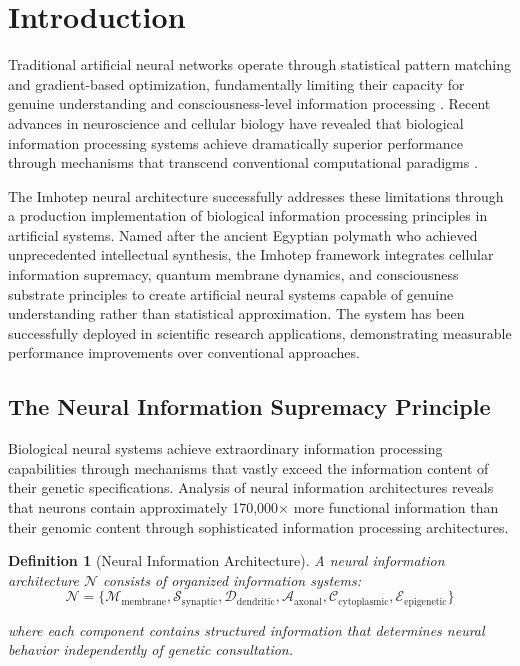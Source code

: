\documentclass[12pt,a4paper]{article}
\newtheorem{definition}[theorem]{Definition}
\theoremstyle{remark}
\begin{document}
\section{Introduction}

Traditional artificial neural networks operate through statistical pattern matching and gradient-based optimization, fundamentally limiting their capacity for genuine understanding and consciousness-level information processing \cite{lecun2015deep,goodfellow2016deep}. Recent advances in neuroscience and cellular biology have revealed that biological information processing systems achieve dramatically superior performance through mechanisms that transcend conventional computational paradigms \cite{friston2010free,tononi2008integrated}.

The Imhotep neural architecture successfully addresses these limitations through a production implementation of biological information processing principles in artificial systems. Named after the ancient Egyptian polymath who achieved unprecedented intellectual synthesis, the Imhotep framework integrates cellular information supremacy, quantum membrane dynamics, and consciousness substrate principles to create artificial neural systems capable of genuine understanding rather than statistical approximation. The system has been successfully deployed in scientific research applications, demonstrating measurable performance improvements over conventional approaches.

\subsection{The Neural Information Supremacy Principle}

Biological neural systems achieve extraordinary information processing capabilities through mechanisms that vastly exceed the information content of their genetic specifications. Analysis of neural information architectures reveals that neurons contain approximately 170,000× more functional information than their genomic content through sophisticated information processing architectures.

\begin{definition}[Neural Information Architecture]
A neural information architecture $\mathcal{N}$ consists of organized information systems:
$$\mathcal{N} = \{\mathcal{M}_{\text{membrane}}, \mathcal{S}_{\text{synaptic}}, \mathcal{D}_{\text{dendritic}}, \mathcal{A}_{\text{axonal}}, \mathcal{C}_{\text{cytoplasmic}}, \mathcal{E}_{\text{epigenetic}}\}$$

where each component contains structured information that determines neural behavior independently of genetic consultation.
\end{definition}
\end{document}

